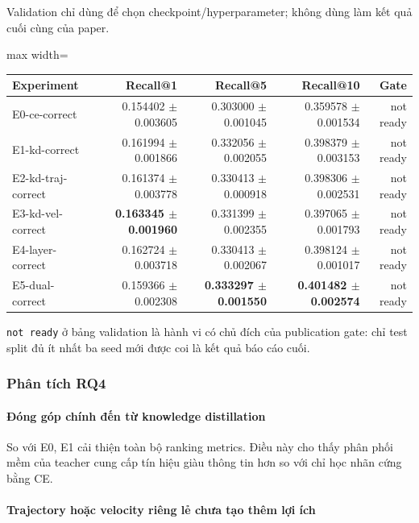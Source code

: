 Validation chỉ dùng để chọn checkpoint/hyperparameter; không dùng làm kết quả cuối cùng của paper.

\begin{table}[!htbp]
\centering
\scriptsize
\setlength{\tabcolsep}{2.5pt}
\begin{adjustbox}{max width=\textwidth}
\begin{tabular}{@{}lrrrr@{}}
\toprule
Experiment & Recall@1 & Recall@5 & Recall@10 & Gate \\
\midrule
E0-ce-correct & 0.154402 $\pm$ 0.003605 & 0.303000 $\pm$ 0.001045 & 0.359578 $\pm$ 0.001534 & not ready \\
E1-kd-correct & 0.161994 $\pm$ 0.001866 & 0.332056 $\pm$ 0.002055 & 0.398379 $\pm$ 0.003153 & not ready \\
E2-kd-traj-correct & 0.161374 $\pm$ 0.003778 & 0.330413 $\pm$ 0.000918 & 0.398306 $\pm$ 0.002531 & not ready \\
E3-kd-vel-correct & \textbf{0.163345 $\pm$ 0.001960} & 0.331399 $\pm$ 0.002355 & 0.397065 $\pm$ 0.001793 & not ready \\
E4-layer-correct & 0.162724 $\pm$ 0.003718 & 0.330413 $\pm$ 0.002067 & 0.398124 $\pm$ 0.001017 & not ready \\
E5-dual-correct & 0.159366 $\pm$ 0.002308 & \textbf{0.333297 $\pm$ 0.001550} & \textbf{0.401482 $\pm$ 0.002574} & not ready \\
\bottomrule
\end{tabular}
\end{adjustbox}
\end{table}

\texttt{not ready} ở bảng validation là hành vi có chủ đích của publication gate: chỉ test split đủ ít nhất ba seed mới được coi là kết quả báo cáo cuối.

\subsubsection*{Phân tích RQ4}

\paragraph{Đóng góp chính đến từ knowledge distillation}

So với E0, E1 cải thiện toàn bộ ranking metrics. Điều này cho thấy phân phối mềm của teacher cung cấp tín hiệu giàu thông tin hơn so với chỉ học nhãn cứng bằng CE.

\paragraph{Trajectory hoặc velocity riêng lẻ chưa tạo thêm lợi ích}

